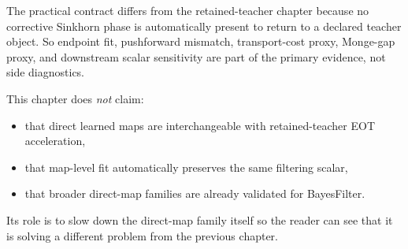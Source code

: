 The practical contract differs from the retained-teacher chapter because no
corrective Sinkhorn phase is automatically present to return to a declared
teacher object.  So endpoint fit, pushforward mismatch, transport-cost proxy,
Monge-gap proxy, and downstream scalar sensitivity are part of the primary
evidence, not side diagnostics.

This chapter does \emph{not} claim:
\begin{itemize}
  \item that direct learned maps are interchangeable with retained-teacher EOT
  acceleration,
  \item that map-level fit automatically preserves the same filtering scalar,
  \item that broader direct-map families are already validated for BayesFilter.
\end{itemize}
Its role is to slow down the direct-map family itself so the reader can see that
it is solving a different problem from the previous chapter.

\FloatBarrier
